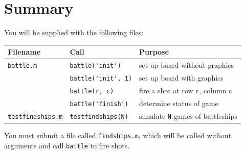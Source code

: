 \documentclass[a4paper, 12pt]{article}
\begin{document}
\section{Summary}
You will be supplied with the following files:\bigskip

\begin{tabular}{lll}
\toprule
Filename & Call  & Purpose \\
\midrule
\verb|battle.m| & \verb|battle('init')| & set up board without
graphics \\
& \verb|battle('init', 1)| & set up board with graphics \\
& \verb|battle(r, c)| & fire a shot at row \verb|r|, column \verb|c| \\
& \verb|battle('finish')| & determine status of game \\ 
\verb|testfindships.m| & \verb|testfindships(N)| & simulate \verb|N| games of
battleships \\
\bottomrule
\end{tabular}\bigskip

You must submit a file called \verb|findships.m|, which will be called
without arguments and call \verb|battle| to fire shots.
\end{document}
